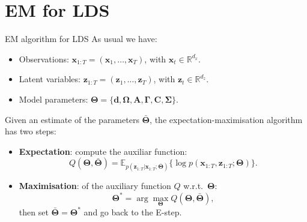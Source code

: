 \documentclass{beamer}
\newcommand{\bs}[1]{\boldsymbol{#1}}
\begin{document}
\section{EM for LDS}

\begin{frame}{EM algorithm for LDS}
 As usual we have:
 \begin{itemize}
  \item Observations: $\bs{x}_{1:T}=(\bs{x}_1,\ldots,\bs{x}_{T})$, with $\bs{x}_t\in\mathbb{R}^{d_x}$.
  \item Latent variables: $\bs{z}_{1:T}=(\bs{z}_1,\ldots,\bs{z}_{T})$, with $\bs{z}_t\in\mathbb{R}^{d_z}$.
  \item Model parameters: $\bs{\Theta} = \{\bs{d}, \bs{\Omega}, \bs{A}, \bs{\Gamma}, \bs{C}, \bs{\Sigma}\}$.
 \end{itemize}\vspace{3mm}
Given an estimate of the parameters $\bar{\bs{\Theta}}$, the expectation-maximisation algorithm has two steps:
\small
\begin{itemize}
 \item \textbf{Expectation}: compute the auxiliar function:
 \begin{equation*}
  Q(\bs{\Theta},\bar{\bs{\Theta}}) = \mathbb{E}_{p(\bs{z}_{1:T}|\bs{x}_{1:T};\bar{\bs{\Theta}})} \{\log p(\bs{x}_{1:T},\bs{z}_{1:T};\bs{\Theta}) \}.
 \end{equation*}
 \item \textbf{Maximisation}: of the auxiliary function $Q$ w.r.t.\ $\bs{\Theta}$:
 \begin{equation*}
  \bs{\Theta}^* = \arg\max_{\bs{\Theta}} Q(\bs{\Theta},\bar{\bs{\Theta}}),
 \end{equation*}
  then set $\bar{\bs{\Theta}}=\bs{\Theta}^*$ and go back to the E-step.
\end{itemize}
\end{frame}
\end{document}

